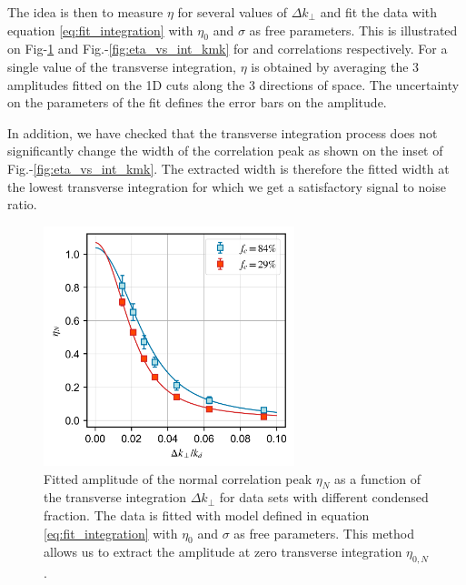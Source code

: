 The idea is then to measure $\eta$ for several values of $\Delta k_{\perp}$ and fit the data with equation \ref{eq:fit_integration} with $\eta_0$ and $\sigma$ as free parameters. This is illustrated on Fig-\ref{fig:integration_kk} and Fig.-\ref{fig:eta_vs_int_kmk} for \kk and \kmk correlations respectively. For a single value of the transverse integration, $\eta$ is obtained by averaging the 3 amplitudes fitted on the 1D cuts along the 3 directions of space. The uncertainty on the parameters of the fit defines the error bars on the amplitude.

In addition, we have checked that the transverse integration process does not significantly change the width of the correlation peak as shown on the inset of Fig.-\ref{fig:eta_vs_int_kmk}. The extracted width is therefore the fitted width at the lowest transverse integration for which we get a satisfactory signal to noise ratio.

\begin{figure}
    \centering
    \includegraphics[width=0.65\textwidth]{Fig/Chapter4/eta_vs_int_kk.png}
    \caption[Fitted amplitude of the normal correlation peak $\eta_N$ as a function of the transverse integration $\Delta k_{\perp}$]{Fitted amplitude of the normal correlation peak $\eta_N$ as a function of the transverse integration $\Delta k_{\perp}$ for data sets with different condensed fraction. The data is fitted with model defined in equation \ref{eq:fit_integration} with $\eta_0$ and $\sigma$ as free parameters. This method allows us to extract the amplitude at zero transverse integration $\eta_{0,N}$.}
    \label{fig:integration_kk}
\end{figure}

